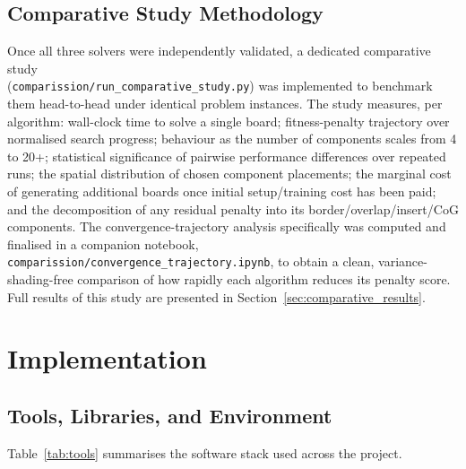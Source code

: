 \documentclass[11pt,a4paper,oneside]{report}
\begin{document}
\section{Comparative Study Methodology}
\label{sec:comparative_methodology}
Once all three solvers were independently validated, a dedicated comparative study\\ (\texttt{comparission/run\_comparative\_study.py}) was implemented to benchmark them head-to-head under identical problem instances. The study measures, per algorithm: wall-clock time to solve a single board; fitness-penalty trajectory over normalised search progress; behaviour as the number of components scales from 4 to 20+; statistical significance of pairwise performance differences over repeated runs; the spatial distribution of chosen component placements; the marginal cost of generating additional boards once initial setup/training cost has been paid; and the decomposition of any residual penalty into its border/overlap/insert/CoG components. The convergence-trajectory analysis specifically was computed and finalised in a companion notebook, \texttt{comparission/convergence\_trajectory.ipynb}, to obtain a clean, variance-shading-free comparison of how rapidly each algorithm reduces its penalty score. Full results of this study are presented in Section~\ref{sec:comparative_results}.

\chapter{Implementation}
\label{chap:implementation}

\section{Tools, Libraries, and Environment}
Table~\ref{tab:tools} summarises the software stack used across the project.
\end{document}
